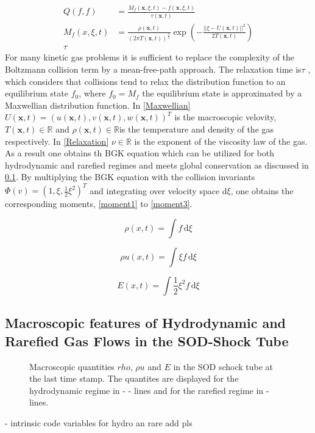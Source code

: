 \documentclass[12pt, a4paper]{article}
\begin{document}
\begin{align}
Q(f,f) &= \frac{M_f(\textbf{x},\xi,t) - f(\textbf{x},\xi,t)}{\tau(\textbf{x},t)} \label{Collision}\\
M_f(x,\xi,t) &= \frac{\rho(\textbf{x},t)}{(2\pi T(\textbf{x},t))^{\frac{3}{2}}}\exp(-\frac{||\xi -U(\textbf{x},t)||^2}{2T(\textbf{x},t)})  \label{Maxwellian}\\
\tau \label{Relaxation}
\end{align}
For many kinetic gas problems it is sufficient to replace the complexity of the Boltzmann collision term by a mean-free-path approach. The relaxation time is$\tau$ , which considers that collisions tend to relax the distribution function to an equilibrium state $f_0$, where $f_0 = M_f$ the equilibrium state is approximated by a Maxwellian distribution function\cite{BGK}. In \cref{Maxwellian} $U(\textbf{x},t) = (u(\textbf{x},t),v(\textbf{x},t),w(\textbf{x},t))^T$ is the macroscopic velovity, $T(\textbf{x},t) \in \mathbb{R}$ and $\rho(\textbf{x},t)\in \mathbb{R}$is the temperature and density of the gas respectively. In \cref{Relaxation} $\nu\in\mathbb{R}$ is the exponent of the viscosity law of the gas. As a result one obtains th BGK equation which can be utilized for both hydrodynamic and rarefied regimes and meets global conservation as discussed in \cref{FeaturesSOD}. By multiplying the BGK equation with the collision invariants $\Phi(v) = (1,\xi,\frac{1}{2}\xi^2)^T$ and integrating over velocity space d$\xi$, one obtains the corresponding moments, \cref{moment1} to \cref{moment3}.\\
\noindent\begin{minipage}{.3\linewidth}
	\begin{equation}
		\rho(x,t) = \int f \,\text{d}\xi \label{moment1}
	\end{equation}
\end{minipage}%
\begin{minipage}{.3\linewidth}
	\begin{equation}
		\rho u(x,t) = \int \xi f \,\text{d}\xi \label{moment2}
	\end{equation}
\end{minipage}%
\begin{minipage}{.31\linewidth}
	\begin{equation}
		E(x,t) = \int \frac{1}{2}\xi^2 f  \,\text{d}\xi \label{moment3}
	\end{equation}
\end{minipage}
\subsection{Macroscopic features of Hydrodynamic and Rarefied Gas Flows in the SOD-Shock Tube} \label{FeaturesSOD}
\begin{figure}[!htbp]
	
	\caption{Macroscopic quantities \(rho\), \(\rho u\) and \(E\) in the SOD schock tube at the last time stamp. The quantites are displayed for the hydrodynamic regime in - - lines and for the rarefied regime in - lines.}
\end{figure}
- intrinsic code variables for hydro an rare add pls
\end{document}
